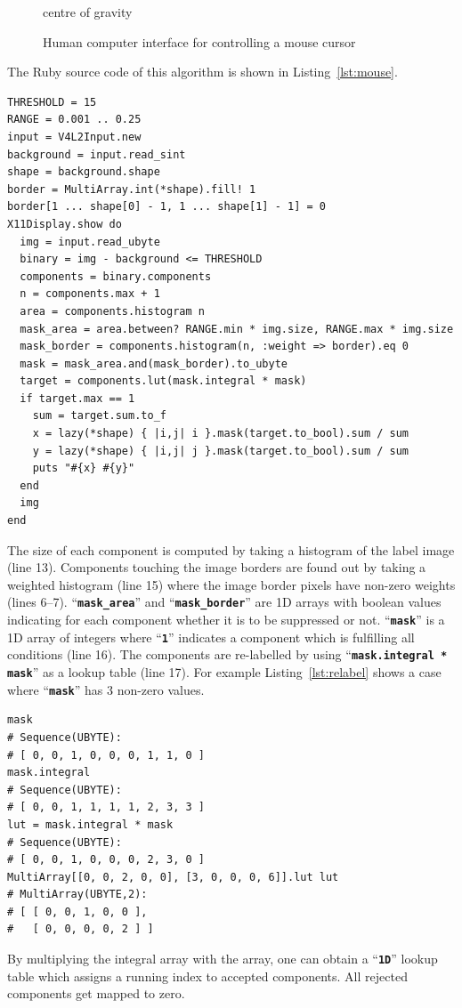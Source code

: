 \documentclass[12pt,a4paper,oneside,openright]{book}
\newcommand{\Eg}{For example }
\newcommand{\lst}[1]{Listing~\ref{lst:#1}}
\newcommand{\code}[1]{``\texttt{\textbf{\textcolor{codegray}{\small{#1}}}}''}
\begin{document}
\begin{CJK}{UTF8}{}
\begin{figure}[htbp]
\begin{center}
\begin{minipage}[t]{.32\textwidth}
\begin{center}
        centre of gravity
      \end{center}
    \end{minipage}
    \caption{Human computer interface for controlling a mouse cursor\label{fig:mouse}}
  \end{center}
\end{figure}

The Ruby source code of this algorithm is shown in \lst{mouse}.
\lstset{language=Ruby,frame=single,numbers=left}
\begin{lstlisting}[float,caption={Human computer interface for controlling the mouse cursor},escapechar=\$,label=lst:mouse]
THRESHOLD = 15
RANGE = 0.001 .. 0.25
input = V4L2Input.new
background = input.read_sint
shape = background.shape
border = MultiArray.int(*shape).fill! 1
border[1 ... shape[0] - 1, 1 ... shape[1] - 1] = 0
X11Display.show do
  img = input.read_ubyte
  binary = img - background <= THRESHOLD
  components = binary.components
  n = components.max + 1
  area = components.histogram n
  mask_area = area.between? RANGE.min * img.size, RANGE.max * img.size
  mask_border = components.histogram(n, :weight => border).eq 0
  mask = mask_area.and(mask_border).to_ubyte
  target = components.lut(mask.integral * mask)
  if target.max == 1
    sum = target.sum.to_f
    x = lazy(*shape) { |i,j| i }.mask(target.to_bool).sum / sum
    y = lazy(*shape) { |i,j| j }.mask(target.to_bool).sum / sum
    puts "#{x} #{y}"
  end
  img
end
\end{lstlisting}
The size of each component is computed by taking a histogram of the label image (line 13). Components touching the image borders are found out by taking a weighted histogram (line 15) where the image border pixels have non-zero weights (lines 6--7). \code{mask\_area} and \code{mask\_border} are \ac{1D} arrays with boolean values indicating for each component whether it is to be suppressed or not. \code{mask} is a \ac{1D} array of integers where \code{1} indicates a component which is fulfilling all conditions (line 16). The components are re-labelled by using \code{mask.integral * mask} as a lookup table (line 17). \Eg \lst{relabel} shows a case where \code{mask} has 3 non-zero values.
\lstset{language=Ruby,frame=single,numbers=none}
\begin{lstlisting}[float,caption={Lookup table for re-labelling},escapechar=\$,label=lst:relabel]
mask
# Sequence(UBYTE):
# [ 0, 0, 1, 0, 0, 0, 1, 1, 0 ]
mask.integral
# Sequence(UBYTE):
# [ 0, 0, 1, 1, 1, 1, 2, 3, 3 ]
lut = mask.integral * mask
# Sequence(UBYTE):
# [ 0, 0, 1, 0, 0, 0, 2, 3, 0 ]
MultiArray[[0, 0, 2, 0, 0], [3, 0, 0, 0, 6]].lut lut
# MultiArray(UBYTE,2):
# [ [ 0, 0, 1, 0, 0 ],
#   [ 0, 0, 0, 0, 2 ] ]
\end{lstlisting}
By multiplying the integral array with the array, one can obtain a \code{1D} lookup table which assigns a running index to accepted components. All rejected components get mapped to zero.


\end{CJK}
\end{document}
